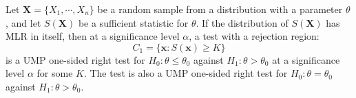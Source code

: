 \documentclass{huhtakm-template-book-v2}
\begin{document}
    \begin{thm}
        \label{Chapter 4 (Theorem) Karlin-Rubin Theorem for sufficient statistic}
        Let $\mathbf{X}=\{X_{1},\cdots,X_{n}\}$ be a random sample from a distribution with a parameter $\theta$, and let $S(\mathbf{X})$ be a sufficient statistic for $\theta$. If the distribution of $S(\mathbf{X})$ has MLR in itself, then at a significance level $\alpha$, a test with a rejection region:
        \begin{equation*}
            C_{1}=\{\mathbf{x}:S(\mathbf{x})\geq K\}
        \end{equation*}
        is a UMP one-sided right test for $H_{0}:\theta\leq\theta_{0}$ against $H_{1}:\theta>\theta_{0}$ at a significance level $\alpha$ for some $K$. The test is also a UMP one-sided right test for $H_{0}:\theta=\theta_{0}$ against $H_{1}:\theta>\theta_{0}$.
    \end{thm}
\end{document}
